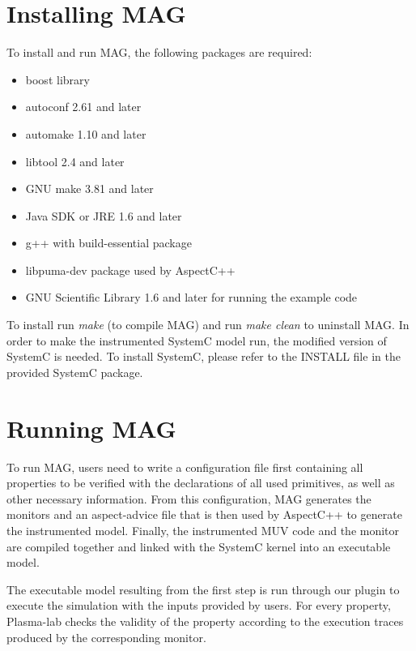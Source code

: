 \documentclass{llncs}
\begin{document}
\section{Installing MAG}
To install and run MAG, the following packages are required:
\begin{itemize}
\item boost library
\item autoconf 2.61 and later
\item automake 1.10 and later
\item libtool 2.4 and later
\item GNU make 3.81 and later
\item Java SDK or JRE 1.6 and later
\item g++ with build-essential package
\item libpuma-dev package used by AspectC++
\item GNU Scientific Library 1.6 and later for running the example code

\end{itemize}
To install run \textit{make} (to compile MAG) and run \textit{make clean} to uninstall MAG. In order to make the instrumented SystemC model run, the modified version of SystemC is needed. To install SystemC, please refer to the INSTALL file in the provided SystemC package.
\section{Running MAG}
To run MAG, users need to write a configuration file first containing all properties to be verified with the declarations of all used primitives, as well as other necessary information. From this configuration, MAG generates the monitors and an aspect-advice file that is then used by AspectC++ to generate the instrumented model. Finally, the instrumented MUV code and the monitor are compiled together and linked with the SystemC kernel into an executable model. 

The executable model resulting from the first step is run through our plugin to execute the simulation with the inputs provided by users. For every property, Plasma-lab checks the validity of the property according to the execution traces produced by the corresponding monitor.
\end{document}
